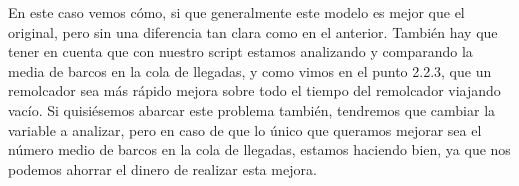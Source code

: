 \documentclass[11pt,a4paper]{report}
\begin{document}
En este caso vemos cómo, si que generalmente este modelo es mejor que el original, pero sin una diferencia tan clara como en el anterior. También hay que tener en cuenta que con
nuestro script estamos analizando y comparando la media de barcos en la cola de llegadas, y como vimos en el punto 2.2.3, que un remolcador sea más rápido mejora sobre todo el
tiempo del remolcador viajando vacío. Si quisiésemos abarcar este problema también, tendremos que cambiar la variable a analizar, pero en caso de que lo único que queramos mejorar
sea el número medio de barcos en la cola de llegadas, estamos haciendo bien, ya que nos podemos ahorrar el dinero de realizar esta mejora.
\end{document}
